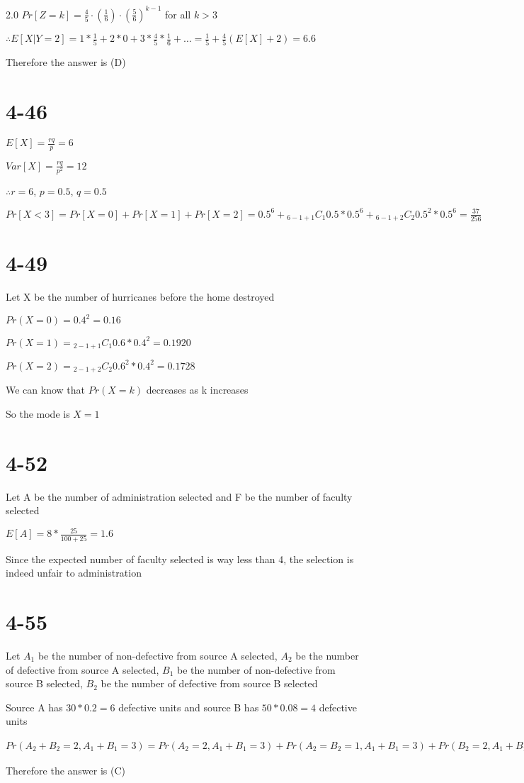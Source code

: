 \documentclass[12pt]{article}
\begin{document}
\begin{spacing}{2.0}
$Pr[Z=k]= \frac{4}{5} \cdot \left( \frac{1}{6} \right) \cdot \left( \frac{5}{6} \right)^{k-1}$ for all $k>3$

$\therefore E[X|Y=2]= 1* \frac{1}{5} + 2*0 + 3* \frac{4}{5}* \frac{1}{6}+ \ldots= \frac{1}{5}+ \frac{4}{5}(E[X]+2) = 6.6$

Therefore the answer is (D)

\section*{4-46}

$E[X]= \frac{rq}{p}= 6$

$Var[X]= \frac{rq}{p^2}= 12$

$\therefore r=6$, $p=0.5$, $q=0.5$

$Pr[X<3]= Pr[X=0]+ Pr[X=1]+ Pr[X=2]= 0.5^6 + {}_{6-1+1}C_{1} 0.5*0.5^6 + {}_{6-1+2}C_{2} 0.5^2*0.5^6 = \frac{37}{256}$

\section*{4-49}

Let X be the number of hurricanes before the home destroyed

$Pr(X=0)= 0.4^2= 0.16$

$Pr(X=1)= {}_{2-1+1}C_{1} 0.6*0.4^2 =0.1920$

$Pr(X=2)= {}_{2-1+2}C_{2} 0.6^2*0.4^2 = 0.1728$

We can know that $Pr(X=k)$ decreases as k increases

So the mode is $X=1$

\section*{4-52}

Let A be the number of administration selected and F be the number of faculty selected

$E[A]= 8* \frac{25}{100+25}= 1.6$

Since the expected number of faculty selected is way less than 4, the selection is indeed unfair to administration

\section*{4-55}

Let $A_1$ be the number of non-defective from source A selected, $A_2$ be the number of defective from source A selected, $B_1$ be the number of non-defective from source B selected, $B_2$ be the number of defective from source B selected

Source A has $30*0.2=6$ defective units and source B has $50*0.08=4$ defective units

$Pr(A_2+B_2=2, A_1+B_1=3)= Pr(A_2=2, A_1+B_1=3) + Pr(A_2=B_2=1, A_1+B_1=3)+ Pr(B_2=2, A_1+B_1=3)= \frac{{}_{6}C_{2}*{}_{70}C_{3}}{{}_{80}C_{5}} + \frac{{}_{6}C_{1}*{}_{4}C_{1}*{}_{70}C_{3}}{{}_{80}C_{5}} + \frac{{}_{4}C_{2}*{70}_{3}C_{}}{{}_{80}C_{5}} \approx 0.102$

Therefore the answer is (C)

\end{spacing}
\end{document}
